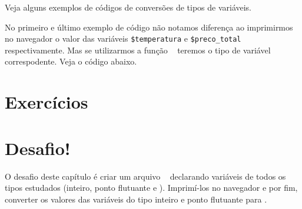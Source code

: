 

Veja alguns exemplos de códigos de conversões de tipos de variáveis.



No primeiro e último exemplo de código não notamos diferença ao imprimirmos no navegador 
o valor das variáveis \texttt{\$temperatura} e \texttt{\$preco\_total} respectivamente. 
Mas se utilizarmos a função \funcaogettype~ teremos o tipo de variável correspodente. Veja
o código abaixo.



\section{Exercícios}
\label{cap3-exercicios}


\section{Desafio!}
\label{cap3-desafio}
O desafio deste capítulo é criar um arquivo \phpextensao~ declarando variáveis de todos os tipos
estudados (inteiro, ponto flutuante e \tipostring). Imprimí-los no navegador e por fim, converter
os valores das variáveis do tipo inteiro e ponto flutuante para \tipostring.
